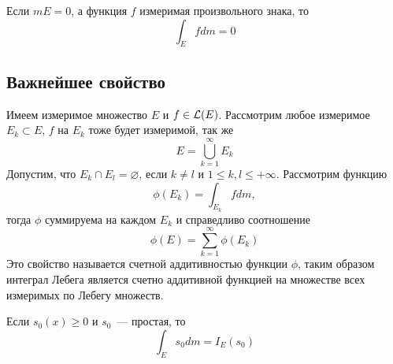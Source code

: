 \documentclass[main]{subfiles}
\begin{document}
\begin{property}
    Если $mE = 0$, а функция $f$ измеримая произвольного знака, то
    \[\int_E f dm = 0\]
\end{property}

\subsection{Важнейшее свойство}

\begin{theorem}
    Имеем измеримое множество $E$ и $f \in \mathcal{L}(E)$.
    Рассмотрим любое измеримое $E_k \subset E$, $f$ на $E_k$ тоже будет измеримой, так же
    \[E = \bigcup_{k=1}^{\infty} E_k\]
    Допустим, что $E_k \cap E_l = \varnothing$, если $k \neq l$ и $1 \le k, l \le +\infty$.
    Рассмотрим функцию
    \[\phi(E_k) = \int_{E_k} fdm, \]
    тогда $\phi$ суммируема на каждом $E_k$ и справедливо соотношение
    \[\phi(E) = \sum_{k=1}^{\infty}\phi(E_k) \tag{10}\]
    Это свойство называется счетной аддитивностью функции $\phi$, таким образом интеграл Лебега является счетно аддитивной функцией на множестве всех измеримых по Лебегу множеств.
\end{theorem}
\begin{remark}
    Если $s_0(x) \ge 0$ и $s_0$~--- простая, то
    \[\int_E s_0 dm = I_E(s_0)\]
\end{remark}
\end{document}
